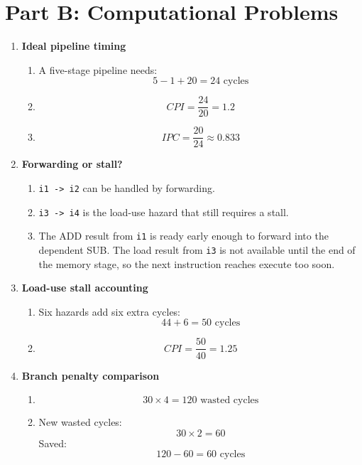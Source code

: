 \documentclass[11pt]{article}
\begin{document}
\section*{Part B: Computational Problems}
\begin{enumerate}[label=\textbf{B\arabic*.}]
  \item \textbf{Ideal pipeline timing}
  \begin{enumerate}[label=(\alph*)]
    \item A five-stage pipeline needs:
    \[
      5 - 1 + 20 = 24 \text{ cycles}
    \]
    \item
    \[
      CPI = \frac{24}{20} = 1.2
    \]
    \item
    \[
      IPC = \frac{20}{24} \approx 0.833
    \]
  \end{enumerate}

  \item \textbf{Forwarding or stall?}
  \begin{enumerate}[label=(\alph*)]
    \item \texttt{i1 -> i2} can be handled by forwarding.
    \item \texttt{i3 -> i4} is the load-use hazard that still requires a stall.
    \item The ADD result from \texttt{i1} is ready early enough to forward into the dependent SUB. The load result from \texttt{i3} is not available until the end of the memory stage, so the next instruction reaches execute too soon.
  \end{enumerate}

  \item \textbf{Load-use stall accounting}
  \begin{enumerate}[label=(\alph*)]
    \item Six hazards add six extra cycles:
    \[
      44 + 6 = 50 \text{ cycles}
    \]
    \item
    \[
      CPI = \frac{50}{40} = 1.25
    \]
  \end{enumerate}

  \item \textbf{Branch penalty comparison}
  \begin{enumerate}[label=(\alph*)]
    \item
    \[
      30 \times 4 = 120 \text{ wasted cycles}
    \]
    \item New wasted cycles:
    \[
      30 \times 2 = 60
    \]
    Saved:
    \[
      120 - 60 = 60 \text{ cycles}
    \]
  \end{enumerate}


\end{enumerate}
\end{document}
